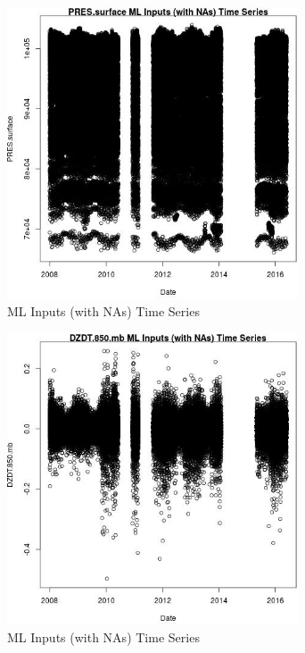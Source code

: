 \begin{figure} 
\centering  
\includegraphics[width=0.77\textwidth]{Code_Outputs/Report_ML_input_PM25_Step4_part_e_de_duplicated_aveswNAs_PRESsurfacevDate.jpg} 
\caption{\label{fig:Report_ML_input_PM25_Step4_part_e_de_duplicated_aveswNAsPRESsurfacevDate}ML Inputs (with NAs) Time Series} 
\end{figure} 
 

\clearpage 

\begin{figure} 
\centering  
\includegraphics[width=0.77\textwidth]{Code_Outputs/Report_ML_input_PM25_Step4_part_e_de_duplicated_aveswNAs_DZDT850mbvDate.jpg} 
\caption{\label{fig:Report_ML_input_PM25_Step4_part_e_de_duplicated_aveswNAsDZDT850mbvDate}ML Inputs (with NAs) Time Series} 
\end{figure} 
 

